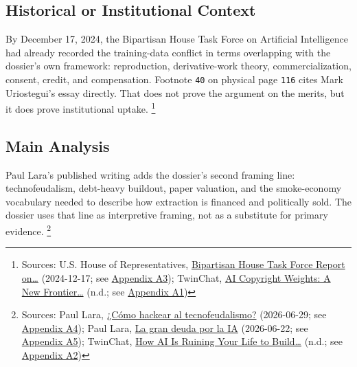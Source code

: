 \documentclass[
  american,
  11pt,
  letterpaper,
]{article}
\begin{document}
\subsection{Historical or Institutional
Context}\label{historical-or-institutional-context}

By December 17, 2024, the Bipartisan House Task Force on Artificial
Intelligence had already recorded the training-data conflict in terms
overlapping with the dossier's own framework: reproduction,
derivative-work theory, commercialization, consent, credit, and
compensation. Footnote \texttt{40} on physical page \texttt{116} cites
Mark Uriostegui's essay directly. That does not prove the argument on
the merits, but it does prove institutional uptake. \footnote{Sources:
  U.S. House of Representatives,
  \href{https://www.speaker.gov/wp-content/uploads/2024/12/AI-Task-Force-Report-FINAL.pdf}{Bipartisan
  House Task Force Report on\ldots{}} (2024-12-17; see
  \hyperref[ch-00-appendix-a3-bipartisan-house-task-force-report-on-artificial-intelligence]{Appendix
  A3}); TwinChat,
  \href{https://medium.com/twinchat/ai-copyright-weights-a-new-frontier-in-intellectual-property-law-d8ee1b6c55ee}{AI
  Copyright Weights: A New Frontier\ldots{}} (n.d.; see
  \hyperref[ch-00-appendix-a1-ai-copyright-weights-a-new-frontier-in-intellectual-property-law]{Appendix
  A1})}

\subsection{Main Analysis}\label{main-analysis}

Paul Lara's published writing adds the dossier's second framing line:
technofeudalism, debt-heavy buildout, paper valuation, and the
smoke-economy vocabulary needed to describe how extraction is financed
and politically sold. The dossier uses that line as interpretive
framing, not as a substitute for primary evidence. \footnote{Sources:
  Paul Lara,
  \href{https://www.dineroenimagen.com/paul-lara/como-hackear-al-tecnofeudalismo/186955}{¿Cómo
  hackear al tecnofeudalismo?} (2026-06-29; see
  \hyperref[ch-00-appendix-a4-c-mo-hackear-al-tecnofeudalismo]{Appendix
  A4}); Paul Lara,
  \href{https://www.dineroenimagen.com/paul-lara/la-gran-deuda-por-la-ia/186930}{La
  gran deuda por la IA} (2026-06-22; see
  \hyperref[ch-00-appendix-a5-la-gran-deuda-por-la-ia]{Appendix A5});
  TwinChat,
  \href{https://medium.com/twinchat/how-ai-is-ruining-your-life-to-build-an-empire-8b6d02e55bc9}{How
  AI Is Ruining Your Life to Build\ldots{}} (n.d.; see
  \hyperref[ch-00-appendix-a2-how-ai-is-ruining-your-life-to-build-an-empire]{Appendix
  A2})}
\end{document}
